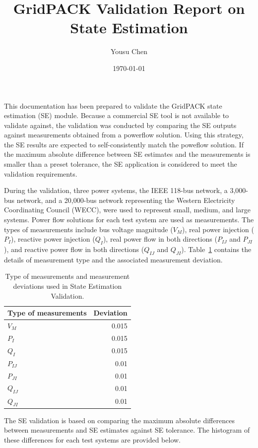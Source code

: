\documentclass[a4paper]{article}
\title{GridPACK Validation Report on State Estimation}
\author{Yousu Chen}
\date{\today}
\begin{document}
\maketitle

This documentation has been prepared to validate the GridPACK state estimation
(SE) module. Because a commercial SE tool is not available to validate against,
the validation was conducted by comparing the SE outputs against  measurements
obtained from a powerflow solution. Using this strategy, the SE results are
expected to self-consistently match the poweflow solution. If the maximum
absolute difference between SE estimates and the measurements is smaller than
a preset tolerance, the SE application is considered to meet the validation
requirements.  

During the validation, three power systems, the IEEE 118-bus network, a
3,000-bus network, and a 20,000-bus network representing the Western Electricity
Coordinating Council (WECC), were used to represent small, medium, and large
systems. Power flow solutions for each test system are used as measurements.
The types of measurements include bus voltage magnitude ($V_M$), real power
injection ($P_I$), reactive power injection ($Q_I$), real power flow in both
directions ($P_{IJ}$ and $P_{JI}$), and reactive power flow in both directions
($Q_{IJ}$ and $Q_{JI}$). Table~\ref{tab:SE}  contains the details of
measurement type and the associated measurement deviation.

\begin{table} [h]
\centering
\begin{tabular}{l|r}
Type of measurements & Deviation \\\hline
$V_M$	& 0.015 \\
$P_I$	& 0.015 \\
$Q_I$	& 0.015 \\
$P_{IJ}$	& 0.01 \\
$P_{JI}$	& 0.01 \\
$Q_{IJ}$	& 0.01 \\
$Q_{JI}$	& 0.01

\end{tabular}
\caption{\label{tab:SE}Type of measurements and measurement deviations used in State Estimation Validation.}
\end{table}

The SE validation is based on comparing the maximum absolute differences
between measurements and SE estimates against SE tolerance. The histogram of
these differences for each test systems are provided below.
\end{document}

